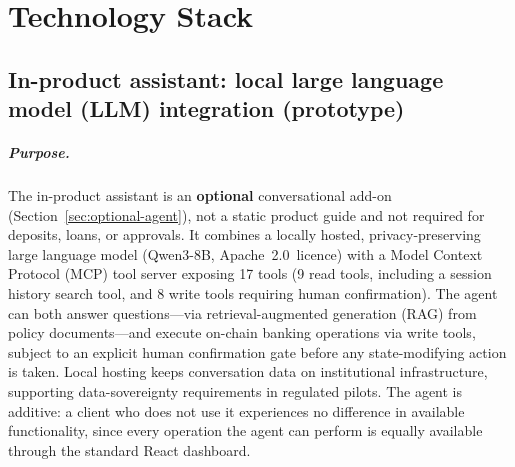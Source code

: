 \documentclass[12pt,a4paper]{report}
\begin{document}
\chapter{Technology Stack}

\section{In-product assistant: local large language model (LLM) integration (prototype)}

\paragraph{Purpose.}
The in-product assistant is an \textbf{optional} conversational add-on (Section~\ref{sec:optional-agent}), not a static product guide and not required for deposits, loans, or approvals. It combines a locally hosted, privacy-preserving large language model (Qwen3-8B, Apache~2.0~licence) with a Model Context Protocol (MCP) tool server exposing 17 tools (9 read tools, including a session history search tool, and 8 write tools requiring human confirmation). The agent can both answer questions---via retrieval-augmented generation (RAG) from policy documents---and execute on-chain banking operations via write tools, subject to an explicit human confirmation gate before any state-modifying action is taken. Local hosting keeps conversation data on institutional infrastructure, supporting data-sovereignty requirements in regulated pilots. The agent is additive: a client who does not use it experiences no difference in available functionality, since every operation the agent can perform is equally available through the standard React dashboard.
\end{document}
